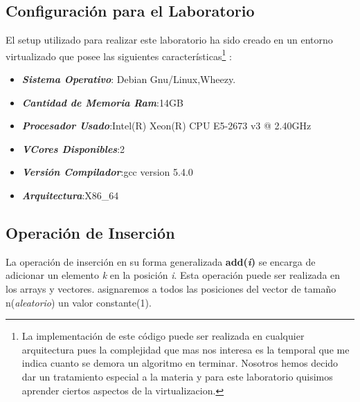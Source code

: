 \documentclass[paper=a4, fontsize=12pt]{article} 		%
\numberwithin{equation}{section}						%
\numberwithin{table}{section} 							%
\begin{document}
\subsection{Configuración para el Laboratorio}
El setup utilizado para realizar este laboratorio ha sido creado en un entorno virtualizado que posee las siguientes características\footnote{La implementación de este código puede ser realizada en cualquier arquitectura pues la complejidad que mas nos interesa es la temporal que me indica cuanto se demora un algoritmo en terminar. Nosotros hemos decido dar un tratamiento especial a la materia y para este laboratorio quisimos aprender ciertos aspectos de la virtualizacion.} :
\begin{itemize}
\item \textbf{\textit{Sistema Operativo}}: Debian Gnu/Linux,Wheezy.
\item \textbf{\textit{Cantidad de Memoria Ram}}:14GB
\item \textbf{\textit{Procesador Usado}}:Intel(R) Xeon(R) CPU E5-2673 v3 @ 2.40GHz
\item \textbf{\textit{VCores Disponibles}}:2
\item \textbf{\textit{Versión Compilador}}:gcc version 5.4.0 
\item \textbf{\textit{Arquitectura}}:X86\_64
\end{itemize}
\subsection{Operación de Inserción}
La operación de inserción en su forma generalizada \textbf{add(\textit{i})}  se encarga de adicionar un elemento \textit{k} en la posición \textit{i}.  
Esta operación puede ser realizada en los arrays y vectores. asignaremos a todos las posiciones del vector de tamaño n(\textit{aleatorio}) un valor constante(\textrm{1}). \\
\end{document}
